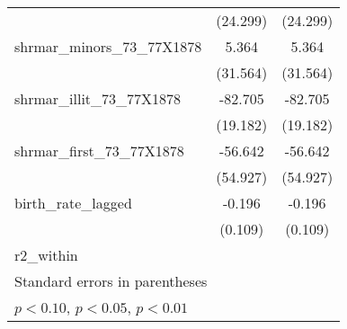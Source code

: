 {\begin{tabular}{l*{2}{c}}
            &    (24.299)         &    (24.299)         \\
[1em]
shrmar\_minors\_73\_77X1878&       5.364         &       5.364         \\
            &    (31.564)         &    (31.564)         \\
[1em]
shrmar\_illit\_73\_77X1878&     -82.705\sym{***}&     -82.705\sym{***}\\
            &    (19.182)         &    (19.182)         \\
[1em]
shrmar\_first\_73\_77X1878&     -56.642         &     -56.642         \\
            &    (54.927)         &    (54.927)         \\
[1em]
birth\_rate\_lagged&      -0.196\sym{*}  &      -0.196\sym{*}  \\
            &     (0.109)         &     (0.109)         \\
\hline
r2\_within   &                     &                     \\
\hline\hline
\multicolumn{3}{l}{\footnotesize Standard errors in parentheses}\\
\multicolumn{3}{l}{\footnotesize \sym{*} \(p<0.10\), \sym{**} \(p<0.05\), \sym{***} \(p<0.01\)}\\
\end{tabular}
}
